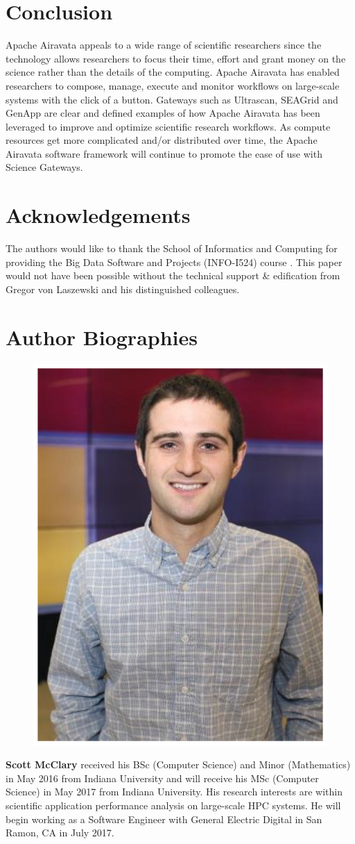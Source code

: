 \documentclass[9pt,twocolumn,twoside]{styles/osajnl}
\begin{document}
\section{Conclusion} \label{conclusion}
Apache Airavata appeals to a wide range of scientific researchers
since the technology allows researchers to focus their time, effort
and grant money on the science rather than the details of the
computing. Apache Airavata has enabled researchers to compose, manage,
execute and monitor workflows on large-scale systems with the click of
a button. Gateways such as Ultrascan, SEAGrid and GenApp are clear and
defined examples of how Apache Airavata has been leveraged to improve
and optimize scientific research workflows. As compute resources get
more complicated and/or distributed over time, the Apache Airavata
software framework will continue to promote the ease of use with
Science Gateways.

\section*{Acknowledgements}
The authors would like to thank the School of Informatics and
Computing for providing the Big Data Software and Projects (INFO-I524)
course \cite{www-i524}. This paper would not have been possible
without the technical support \& edification from Gregor von Laszewski
and his distinguished colleagues.

 
\section*{Author Biographies}
\begingroup
\setlength\intextsep{0pt}
\begin{minipage}[t][3.2cm][t]{1.0\columnwidth} 
  \begin{figure}
    \includegraphics[width=0.25\columnwidth]{images/scott_mcclary}
  \end{figure}
  \noindent
  {\bfseries Scott McClary} received his BSc (Computer Science) and
  Minor (Mathematics) in May 2016 from Indiana University and will
  receive his MSc (Computer Science) in May 2017 from Indiana
  University. His research interests are within scientific application
  performance analysis on large-scale HPC systems. He will begin
  working as a Software Engineer with General Electric Digital in San
  Ramon, CA in July 2017.
\end{minipage}
\endgroup
\end{document}
